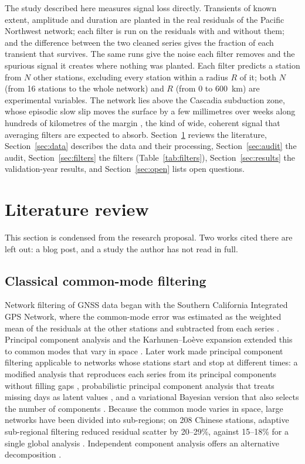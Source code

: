 \documentclass[preprint,12pt,authoryear]{elsarticle}
\begin{document}
The study described here measures signal loss directly. Transients of known extent, amplitude and duration are planted in the real residuals of the Pacific Northwest network; each filter is run on the residuals with and without them; and the difference between the two cleaned series gives the fraction of each transient that survives. The same runs give the noise each filter removes and the spurious signal it creates where nothing was planted. Each filter predicts a station from $N$ other stations, excluding every station within a radius $R$ of it; both $N$ (from 16 stations to the whole network) and $R$ (from 0 to 600~km) are experimental variables. The network lies above the Cascadia subduction zone, whose episodic slow slip moves the surface by a few millimetres over weeks along hundreds of kilometres of the margin \citep{michel2019}, the kind of wide, coherent signal that averaging filters are expected to absorb. Section~\ref{sec:literature} reviews the literature, Section~\ref{sec:data} describes the data and their processing, Section~\ref{sec:audit} the audit, Section~\ref{sec:filters} the filters (Table~\ref{tab:filters}), Section~\ref{sec:results} the validation-year results, and Section~\ref{sec:open} lists open questions.

\section{Literature review}
\label{sec:literature}

This section is condensed from the research proposal. Two works cited there are left out: a blog post, and a study the author has not read in full.

\subsection{Classical common-mode filtering}

Network filtering of GNSS data began with the Southern California Integrated GPS Network, where the common-mode error was estimated as the weighted mean of the residuals at the other stations and subtracted from each series \citep{wdowinski1997}. Principal component analysis and the Karhunen--Lo\`eve expansion extended this to common modes that vary in space \citep{dong2006}. Later work made principal component filtering applicable to networks whose stations start and stop at different times: a modified analysis that reproduces each series from its principal components without filling gaps \citep{shen2014}, probabilistic principal component analysis that treats missing days as latent values \citep{gruszczynski2018}, and a variational Bayesian version that also selects the number of components \citep{li2020vbpca}. Because the common mode varies in space, large networks have been divided into sub-regions; on 208 Chinese stations, adaptive sub-regional filtering reduced residual scatter by 20--29\%, against 15--18\% for a single global analysis \citep{liu2026}. Independent component analysis offers an alternative decomposition \citep{gualandi2016, zhou2022}.
\end{document}
